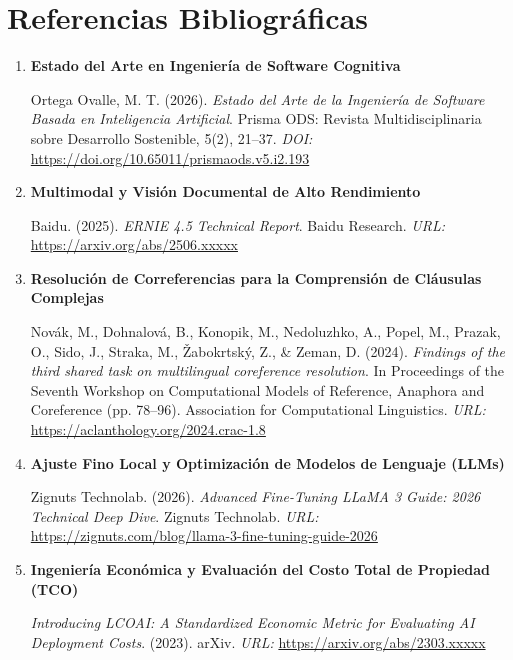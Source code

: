 \documentclass[12pt]{article}
\begin{document}
\section{Referencias Bibliográficas}

\begin{enumerate}
    \item \textbf{Estado del Arte en Ingeniería de Software Cognitiva}

    Ortega Ovalle, M. T. (2026). \textit{Estado del Arte de la Ingeniería de Software Basada en Inteligencia Artificial}. Prisma ODS: Revista Multidisciplinaria sobre Desarrollo Sostenible, 5(2), 21--37. \newline
    \textit{DOI:} \url{https://doi.org/10.65011/prismaods.v5.i2.193}

    \item \textbf{Multimodal y Visión Documental de Alto Rendimiento}

    Baidu. (2025). \textit{ERNIE 4.5 Technical Report}. Baidu Research. \newline
    \textit{URL:} \url{https://arxiv.org/abs/2506.xxxxx}

    \item \textbf{Resolución de Correferencias para la Comprensión de Cláusulas Complejas}

    Novák, M., Dohnalová, B., Konopik, M., Nedoluzhko, A., Popel, M., Prazak, O., Sido, J., Straka, M., Žabokrtský, Z., \& Zeman, D. (2024). \textit{Findings of the third shared task on multilingual coreference resolution}. In Proceedings of the Seventh Workshop on Computational Models of Reference, Anaphora and Coreference (pp. 78--96). Association for Computational Linguistics. \newline
    \textit{URL:} \url{https://aclanthology.org/2024.crac-1.8}

    \item \textbf{Ajuste Fino Local y Optimización de Modelos de Lenguaje (LLMs)}

    Zignuts Technolab. (2026). \textit{Advanced Fine-Tuning LLaMA 3 Guide: 2026 Technical Deep Dive}. Zignuts Technolab. \newline
    \textit{URL:} \url{https://zignuts.com/blog/llama-3-fine-tuning-guide-2026}

    \item \textbf{Ingeniería Económica y Evaluación del Costo Total de Propiedad (TCO)}

    \textit{Introducing LCOAI: A Standardized Economic Metric for Evaluating AI Deployment Costs}. (2023). arXiv. \newline
    \textit{URL:} \url{https://arxiv.org/abs/2303.xxxxx}
    
\end{enumerate}
\end{document}
